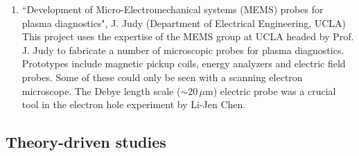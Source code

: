 \documentclass[11pt]{article}
\begin{document}
\begin{enumerate}
\item ``Development of Micro-Electromechanical systems (MEMS) probes for plasma diagnostics",
J. Judy (Department of Electrical Engineering, UCLA)
This project uses the expertise of the MEMS group at UCLA headed by Prof. J. Judy to fabricate a number of microscopic probes for plasma diagnostics.  Prototypes include magnetic pickup coils, energy analyzers and electric field probes.  Some of these could only be seen with a scanning electron microscope.  The Debye length scale ($\sim 20\, \mu$m) electric probe was a crucial tool in the electron hole experiment by Li-Jen Chen.  

\end{enumerate}

\subsection{Theory-driven studies}
\end{document}
